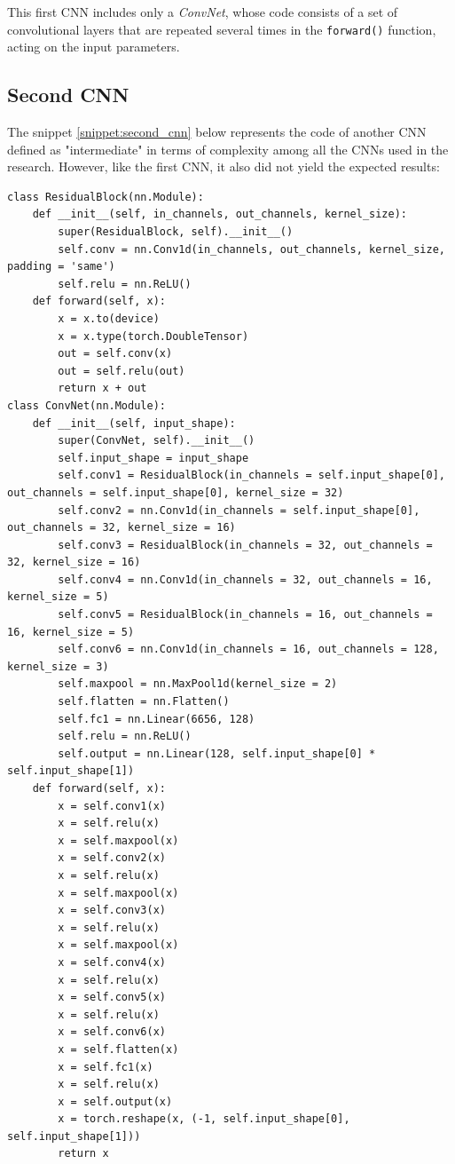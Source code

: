 \documentclass[12pt,english]{report}
\begin{document}
This first CNN includes only a \textit{ConvNet}, whose code consists of a set of convolutional layers that are repeated several times in the \texttt{forward()} function, acting on the input parameters.

\subsection{Second CNN}
\label{subsec:second_cnn}

The snippet \ref{snippet:second_cnn} below represents the code of another CNN defined as "intermediate" in terms of complexity among all the CNNs used in the research. However, like the first CNN, it also did not yield the expected results:

\lstset{language=Python}
\begin{lstlisting}[aboveskip=15pt, belowskip=15pt, basicstyle=\fontsize{8}{10}\selectfont, keywordstyle=\color{blue}, breaklines=true, label=snippet:second_cnn]
class ResidualBlock(nn.Module):
    def __init__(self, in_channels, out_channels, kernel_size):
        super(ResidualBlock, self).__init__()
        self.conv = nn.Conv1d(in_channels, out_channels, kernel_size, padding = 'same')
        self.relu = nn.ReLU()
    def forward(self, x):
        x = x.to(device)
        x = x.type(torch.DoubleTensor)
        out = self.conv(x)
        out = self.relu(out)
        return x + out
class ConvNet(nn.Module):
    def __init__(self, input_shape):
        super(ConvNet, self).__init__()
        self.input_shape = input_shape
        self.conv1 = ResidualBlock(in_channels = self.input_shape[0], out_channels = self.input_shape[0], kernel_size = 32)
        self.conv2 = nn.Conv1d(in_channels = self.input_shape[0], out_channels = 32, kernel_size = 16)
        self.conv3 = ResidualBlock(in_channels = 32, out_channels = 32, kernel_size = 16)
        self.conv4 = nn.Conv1d(in_channels = 32, out_channels = 16, kernel_size = 5)
        self.conv5 = ResidualBlock(in_channels = 16, out_channels = 16, kernel_size = 5)
        self.conv6 = nn.Conv1d(in_channels = 16, out_channels = 128, kernel_size = 3)
        self.maxpool = nn.MaxPool1d(kernel_size = 2)
        self.flatten = nn.Flatten()
        self.fc1 = nn.Linear(6656, 128)
        self.relu = nn.ReLU()
        self.output = nn.Linear(128, self.input_shape[0] * self.input_shape[1])
    def forward(self, x):
        x = self.conv1(x)
        x = self.relu(x)
        x = self.maxpool(x)
        x = self.conv2(x)
        x = self.relu(x)
        x = self.maxpool(x)
        x = self.conv3(x)
        x = self.relu(x)
        x = self.maxpool(x)
        x = self.conv4(x)
        x = self.relu(x)
        x = self.conv5(x)
        x = self.relu(x)
        x = self.conv6(x)
        x = self.flatten(x)
        x = self.fc1(x)
        x = self.relu(x)
        x = self.output(x)
        x = torch.reshape(x, (-1, self.input_shape[0], self.input_shape[1]))
        return x
\end{lstlisting}
\end{document}
